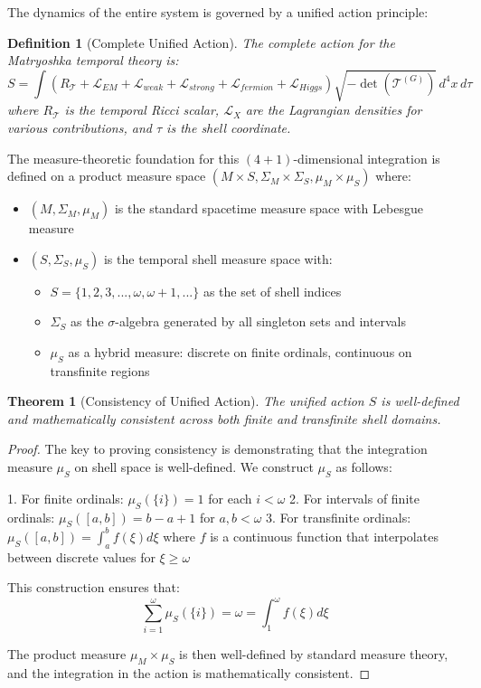 \documentclass[12pt,a4paper]{article}
\newtheorem{theorem}{Theorem}[section]
\newtheorem{definition}{Definition}[section]
\begin{document}
The dynamics of the entire system is governed by a unified action principle:

\begin{definition}[Complete Unified Action]
\label{def:unified-action}
The complete action for the Matryoshka temporal theory is:
\begin{equation}
S = \int \left(R_\mathcal{T} + \mathcal{L}_{EM} + \mathcal{L}_{weak} + \mathcal{L}_{strong} + \mathcal{L}_{fermion} + \mathcal{L}_{Higgs}\right) \sqrt{-\det(\mathcal{T}^{(G)})} \, d^4x \, d\tau
\end{equation}
where $R_\mathcal{T}$ is the temporal Ricci scalar, $\mathcal{L}_X$ are the Lagrangian densities for various contributions, and $\tau$ is the shell coordinate.
\end{definition}

The measure-theoretic foundation for this $(4+1)$-dimensional integration is defined on a product measure space $(M \times S, \Sigma_M \times \Sigma_S, \mu_M \times \mu_S)$ where:
\begin{itemize}
    \item $(M, \Sigma_M, \mu_M)$ is the standard spacetime measure space with Lebesgue measure
    \item $(S, \Sigma_S, \mu_S)$ is the temporal shell measure space with:
    \begin{itemize}
        \item $S = \{1, 2, 3, ..., \omega, \omega+1, ...\}$ as the set of shell indices
        \item $\Sigma_S$ as the $\sigma$-algebra generated by all singleton sets and intervals
        \item $\mu_S$ as a hybrid measure: discrete on finite ordinals, continuous on transfinite regions
    \end{itemize}
\end{itemize}

\begin{theorem}[Consistency of Unified Action]
\label{thm:action-consistency}
The unified action $S$ is well-defined and mathematically consistent across both finite and transfinite shell domains.
\end{theorem}

\begin{proof}
The key to proving consistency is demonstrating that the integration measure $\mu_S$ on shell space is well-defined. We construct $\mu_S$ as follows:

1. For finite ordinals: $\mu_S(\{i\}) = 1$ for each $i < \omega$
2. For intervals of finite ordinals: $\mu_S([a,b]) = b-a+1$ for $a,b < \omega$
3. For transfinite ordinals: $\mu_S([a,b]) = \int_a^b f(\xi) d\xi$ where $f$ is a continuous function that interpolates between discrete values for $\xi \geq \omega$

This construction ensures that:
\begin{equation}
\sum_{i=1}^{\omega} \mu_S(\{i\}) = \omega = \int_1^{\omega} f(\xi) d\xi
\end{equation}

The product measure $\mu_M \times \mu_S$ is then well-defined by standard measure theory, and the integration in the action is mathematically consistent.
\end{proof}
\end{document}
